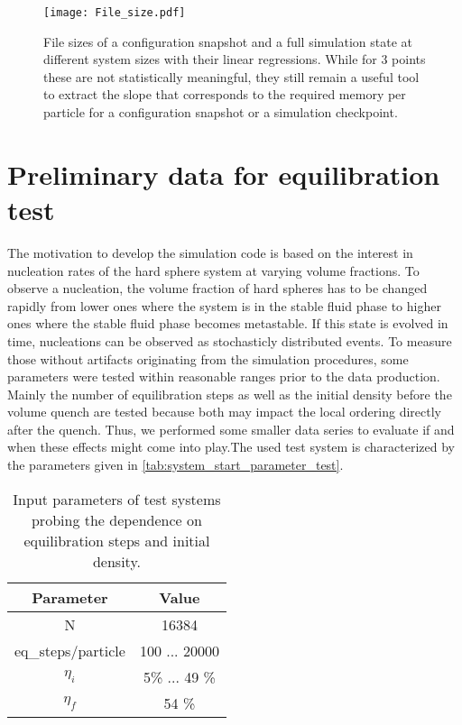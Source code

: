 \begin{figure}[h!]
\centering
\texttt{[image: File\_size.pdf]}
\caption[File size estimate of the simulation]{File sizes of a configuration snapshot and a full simulation state at different system sizes with their linear regressions. While for 3 points these are not statistically meaningful, they still remain a useful tool to extract the slope that corresponds to the required memory per particle for a configuration snapshot or a simulation checkpoint.}
\label{fig:file_size}
\end{figure}

\section{Preliminary data for equilibration test}
\label{sec:data}
The motivation to develop the simulation code is based on the interest in nucleation rates of the hard sphere system at varying volume fractions. To observe a nucleation, the volume fraction of hard spheres has to be changed rapidly from lower ones where the system is in the stable fluid phase to higher ones where the stable fluid phase becomes metastable. If this state is evolved in time, nucleations can be observed as stochasticly distributed events. To measure those without artifacts originating from the simulation procedures, some parameters were tested within reasonable ranges prior to the data production.\\
Mainly the number of equilibration steps as well as the initial density before the volume quench are tested because both may impact the local ordering directly after the quench. Thus, we performed some smaller data series to evaluate if and when these effects might come into play.The used test system is characterized by the parameters given in \autoref{tab:system_start_parameter_test}.\\

\begin{table}
\centering
\begin{tabular}{c|c}
Parameter & Value \\ \hline
N & 16384 \\
eq\_steps/particle & 100 ... 20000 \\
$\eta_i$ & 5\% ... 49 \% \\
$\eta_f$ & 54 \% \\
\end{tabular}
\caption[Simulation parameters for testing equilibration step number and initial density]{Input parameters of test systems probing the dependence on equilibration steps and initial density.}
\label{tab:system_start_parameter_test}
\end{table}

